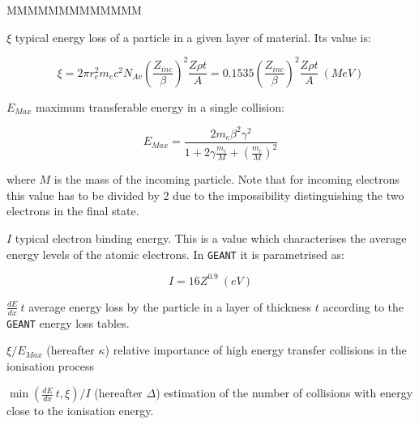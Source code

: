 \begin{DLtt}{MMMMMMMMMMMMM}
\item[$\xi$] typical energy loss of
a particle in a given layer of material. Its value is:

\[
\xi = 2 \pi r_{e}^{2} m_{e} c^{2} N_{Av} \left ( \frac{Z_{inc}}
{\beta} \right )^{2} \frac{Z \rho t}{A} = 0.1535 \left ( \frac{Z_{inc}}
{\beta} \right )^{2} \frac{Z \rho t}{A} \: (MeV)
\]

\item[$E_{Max}$] maximum transferable energy in a single collision:

\[
E_{Max} = \frac{2 m_{e} \beta^{2} \gamma^{2}}{1 +2 \gamma \frac{m_{e}}
{M} +\left ( \frac{m_{e}}{M} \right ) ^{2}}
\]

where $M$ is the mass of the incoming particle. Note that for incoming
electrons this value has to be divided by 2 due to the impossibility
distinguishing the two electrons in the final state.

\item[$I$] typical electron binding energy. This is a value which 
characterises the average energy levels of the atomic electrons. In
{\tt GEANT} it is parametrised as:

\[
I = 16 Z^{0.9} \: (eV)
\]

\item[$\displaystyle \frac{dE}{dx} \: t$] 
average energy loss by the particle in a
layer of thickness $t$ according to the {\tt GEANT} energy loss tables.

\item[$\xi/E_{Max}$] (hereafter $\kappa$) 
relative importance of high energy transfer collisions 
in the ionisation process

\item[$\min \left ( \frac{dE}{dx} \: t,\xi \right )/I$] 
(hereafter $\Delta$) estimation of the number of collisions
with energy close to the ionisation energy.
\end{DLtt}


